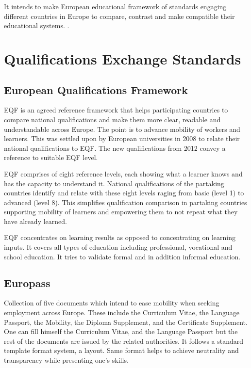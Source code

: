 \documentclass[12pt,a4paper,oneside]{book} %
\begin{document}
It intends to make European educational framework of standards engaging different countries in Europe to compare, contrast and make compatible their educational systems. \cite{bologna process}.

\section{Qualifications Exchange Standards}

    \subsection{European Qualifications Framework}
    EQF is an agreed reference framework that helps participating countries to compare national qualifications and make them more clear, readable and understandable across Europe. The point is to advance mobility of workers and learners. This was settled upon by European universities in 2008 to relate their national qualifications to EQF. The new qualifications from 2012 convey a reference to suitable EQF level.

    EQF comprises of eight reference levels, each showing what a learner knows and has the capacity to understand it. National qualifications of the partaking countries identify and relate with these eight levels raging from basic (level 1) to advanced (level 8). This simplifies qualification comparison in partaking countries supporting mobility of learners and empowering them to not repeat what they have already learned.
    
    EQF concentrates on learning results as opposed to concentrating on learning inputs. It covers all types of education including professional, vocational and school education. It tries to validate formal and in addition informal education.
    
    \subsection{Europass}
    Collection of five documents which intend to ease mobility when seeking employment across Europe. These include the Curriculum Vitae, the Language Passport, the Mobility, the Diploma Supplement, and the Certificate Supplement. One can fill himself the Curriculum Vitae, and the Language Passport but the rest of the documents are issued by the related authorities. It follows a standard template format system, a layout. Same format helps to achieve neutrality and transparency while presenting one's skills.
\end{document}

